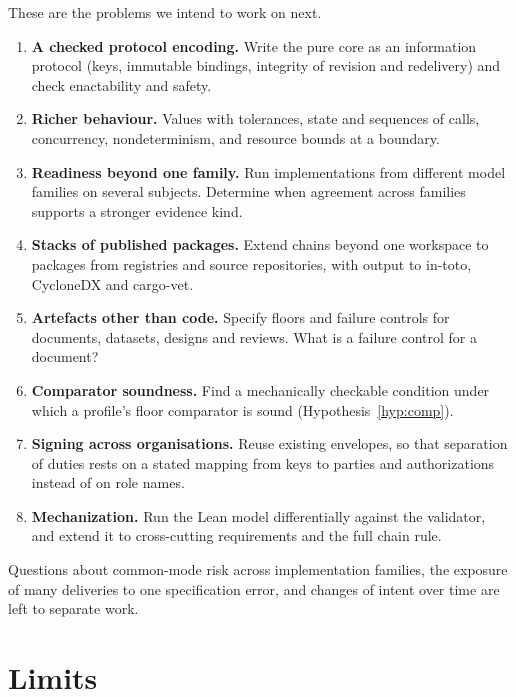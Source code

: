 \documentclass[11pt]{article}
\theoremstyle{definition}
\theoremstyle{remark}
\begin{document}
These are the problems we intend to work on next.
\begin{enumerate}[itemsep=1pt]
\item \textbf{A checked protocol encoding.} Write the pure core as an information protocol (keys,
  immutable bindings, integrity of revision and redelivery) and check enactability and safety.
\item \textbf{Richer behaviour.} Values with tolerances, state and sequences of calls,
  concurrency, nondeterminism, and resource bounds at a boundary.
\item \textbf{Readiness beyond one family.} Run implementations from different model families on
  several subjects. Determine when agreement across families supports a stronger evidence kind.
\item \textbf{Stacks of published packages.} Extend chains beyond one workspace to packages from
  registries and source repositories, with output to in-toto, CycloneDX and cargo-vet.
\item \textbf{Artefacts other than code.} Specify floors and failure controls for documents,
  datasets, designs and reviews. What is a failure control for a document?
\item \textbf{Comparator soundness.} Find a mechanically checkable condition under which a
  profile's floor comparator is sound (Hypothesis~\ref{hyp:comp}).
\item \textbf{Signing across organisations.} Reuse existing envelopes, so that separation of duties
  rests on a stated mapping from keys to parties and authorizations instead of on role names.
\item \textbf{Mechanization.} Run the Lean model differentially against the validator, and extend it
  to cross-cutting requirements and the full chain rule.
\end{enumerate}
Questions about common-mode risk across implementation families, the exposure of many deliveries
to one specification error, and changes of intent over time are left to separate work.

\section{Limits}\label{sec:limits}
\end{document}
